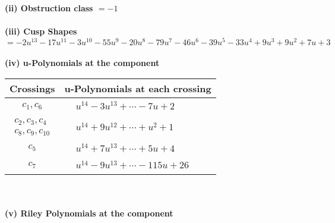 \documentclass[1p]{elsarticle_modified}
\theoremstyle{definition}
\begin{document}
\flushleft \textbf{(ii) Obstruction class $= -1$}\\~\\
\flushleft \textbf{(iii) Cusp Shapes $= -2 u^{13}-17 u^{11}-3 u^{10}-55 u^9-20 u^8-79 u^7-46 u^6-39 u^5-33 u^4+9 u^3+9 u^2+7 u+3$}\\~\\
\newpage\renewcommand{\arraystretch}{1}
\flushleft \textbf{(iv) u-Polynomials at the component}\newline \\
\begin{tabular}{m{50pt}|m{274pt}}
Crossings & \hspace{64pt}u-Polynomials at each crossing \\
\hline $$\begin{aligned}c_{1},c_{6}\end{aligned}$$&$\begin{aligned}
&u^{14}-3 u^{13}+\cdots-7 u+2
\end{aligned}$\\
\hline $$\begin{aligned}c_{2},c_{3},c_{4}\\c_{8},c_{9},c_{10}\end{aligned}$$&$\begin{aligned}
&u^{14}+9 u^{12}+\cdots+u^2+1
\end{aligned}$\\
\hline $$\begin{aligned}c_{5}\end{aligned}$$&$\begin{aligned}
&u^{14}+7 u^{13}+\cdots+5 u+4
\end{aligned}$\\
\hline $$\begin{aligned}c_{7}\end{aligned}$$&$\begin{aligned}
&u^{14}-9 u^{13}+\cdots-115 u+26
\end{aligned}$\\
\hline
\end{tabular}\\~\\
\newpage\renewcommand{\arraystretch}{1}
\flushleft \textbf{(v) Riley Polynomials at the component}\newline \\
\end{document}
